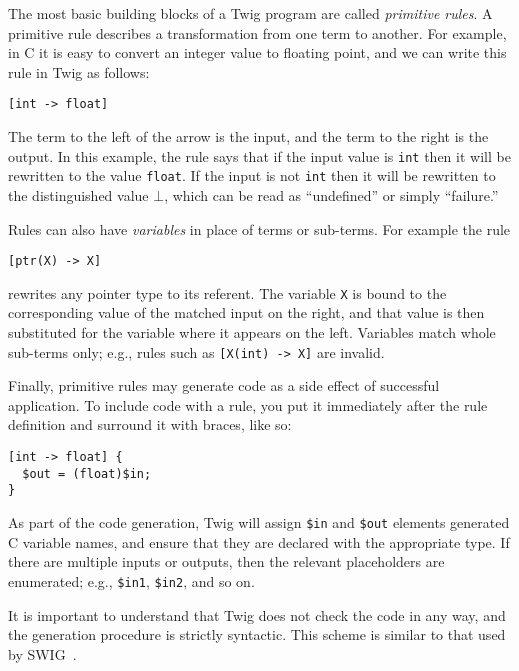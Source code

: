 
The most basic building blocks of a Twig program are called \emph{primitive
rules}. A primitive rule describes a transformation from one term to another.
For example, in C it is easy to convert an integer value to floating point, and
we can write this rule in Twig as follows:

\begin{verbatim}
[int -> float]
\end{verbatim}

The term to the left of the arrow is the input, and the term to the right is the
output. In this example, the rule says that if the input value is \texttt{int}
then it will be rewritten to the value \texttt{float}. If the input is not
\texttt{int} then it will be rewritten to the distinguished value $\bot$, which
can be read as ``undefined'' or simply ``failure.''

Rules can also have \emph{variables} in place of terms or sub-terms. For
example the rule

\begin{verbatim}
[ptr(X) -> X]
\end{verbatim}

rewrites any pointer type to its referent. The variable \texttt{X} is bound to
the corresponding value of the matched input on the right, and that value is
then substituted for the variable where it appears on the left. Variables
match whole sub-terms only; e.g., rules such as \texttt{[X(int) -> X]} are
invalid.

Finally, primitive rules may generate code as a side effect of successful
application. To include code with a rule, you put it immediately after the
rule definition and surround it with braces, like so:

\begin{verbatim}
[int -> float] {
  $out = (float)$in;
}
\end{verbatim}

As part of the code generation, Twig will assign \texttt{\$in} and
\texttt{\$out} elements generated C variable names, and ensure that they are
declared with the appropriate type. If there are multiple inputs or outputs,
then the relevant placeholders are enumerated; e.g., \texttt{\$in1},
\texttt{\$in2}, and so on.

It is important to understand that Twig does not check the code in any way,
and the generation procedure is strictly syntactic. This scheme is similar to
that used by SWIG~\cite{swig}.

